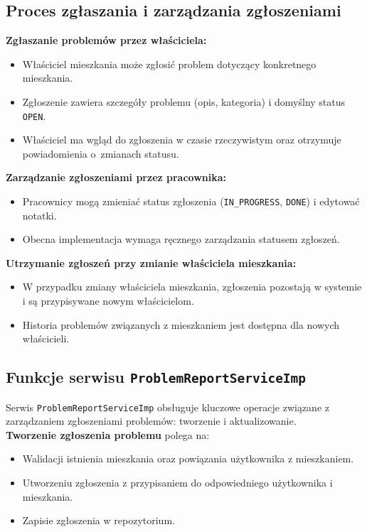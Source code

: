 \subsection{Proces zgłaszania i zarządzania zgłoszeniami}

\textbf{Zgłaszanie problemów przez właściciela:}
\begin{itemize}
    \item Właściciel mieszkania może zgłosić problem dotyczący konkretnego mieszkania.
    \item Zgłoszenie zawiera szczegóły problemu (opis, kategoria) i domyślny status \texttt{OPEN}.
    \item Właściciel ma wgląd do zgłoszenia w czasie rzeczywistym oraz otrzymuje powiadomienia o~zmianach statusu.
\end{itemize}

\noindent \textbf{Zarządzanie zgłoszeniami przez pracownika:}
\begin{itemize}
    \item Pracownicy mogą zmieniać status zgłoszenia (\texttt{IN\_PROGRESS}, \texttt{DONE}) i edytować notatki.
    \item Obecna implementacja wymaga ręcznego zarządzania statusem zgłoszeń.
\end{itemize}

\noindent \textbf{Utrzymanie zgłoszeń przy zmianie właściciela mieszkania:}
\begin{itemize}
    \item W przypadku zmiany właściciela mieszkania, zgłoszenia pozostają w systemie i są przypisywane nowym właścicielom.
    \item Historia problemów związanych z mieszkaniem jest dostępna dla nowych właścicieli.
\end{itemize}

\subsection{Funkcje serwisu \texttt{ProblemReportServiceImp}}

Serwis \texttt{ProblemReportServiceImp} obsługuje kluczowe operacje związane z zarządzaniem zgłoszeniami problemów: tworzenie i aktualizowanie.\\[-10pt]

\noindent \textbf{Tworzenie zgłoszenia problemu} polega na:
\begin{itemize}
    \item Walidacji istnienia mieszkania oraz powiązania użytkownika z mieszkaniem.
    \item Utworzeniu zgłoszenia z przypisaniem do odpowiedniego użytkownika i mieszkania.
    \item Zapisie zgłoszenia w repozytorium.
\end{itemize}

